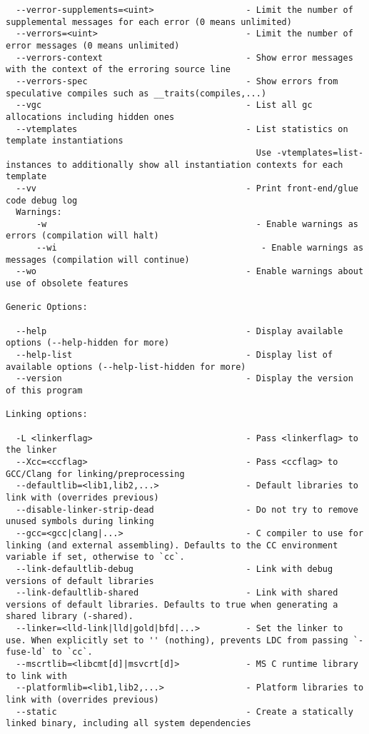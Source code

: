 \documentclass[732]{studrep}
\begin{document}
\begin{verbatim}
  --verror-supplements=<uint>                  - Limit the number of supplemental messages for each error (0 means unlimited)
  --verrors=<uint>                             - Limit the number of error messages (0 means unlimited)
  --verrors-context                            - Show error messages with the context of the erroring source line
  --verrors-spec                               - Show errors from speculative compiles such as __traits(compiles,...)
  --vgc                                        - List all gc allocations including hidden ones
  --vtemplates                                 - List statistics on template instantiations
                                                 Use -vtemplates=list-instances to additionally show all instantiation contexts for each template
  --vv                                         - Print front-end/glue code debug log
  Warnings:
      -w                                         - Enable warnings as errors (compilation will halt)
      --wi                                        - Enable warnings as messages (compilation will continue)
  --wo                                         - Enable warnings about use of obsolete features

Generic Options:

  --help                                       - Display available options (--help-hidden for more)
  --help-list                                  - Display list of available options (--help-list-hidden for more)
  --version                                    - Display the version of this program

Linking options:

  -L <linkerflag>                              - Pass <linkerflag> to the linker
  --Xcc=<ccflag>                               - Pass <ccflag> to GCC/Clang for linking/preprocessing
  --defaultlib=<lib1,lib2,...>                 - Default libraries to link with (overrides previous)
  --disable-linker-strip-dead                  - Do not try to remove unused symbols during linking
  --gcc=<gcc|clang|...>                        - C compiler to use for linking (and external assembling). Defaults to the CC environment variable if set, otherwise to `cc`.
  --link-defaultlib-debug                      - Link with debug versions of default libraries
  --link-defaultlib-shared                     - Link with shared versions of default libraries. Defaults to true when generating a shared library (-shared).
  --linker=<lld-link|lld|gold|bfd|...>         - Set the linker to use. When explicitly set to '' (nothing), prevents LDC from passing `-fuse-ld` to `cc`.
  --mscrtlib=<libcmt[d]|msvcrt[d]>             - MS C runtime library to link with
  --platformlib=<lib1,lib2,...>                - Platform libraries to link with (overrides previous)
  --static                                     - Create a statically linked binary, including all system dependencies


\end{verbatim}
\end{document}
